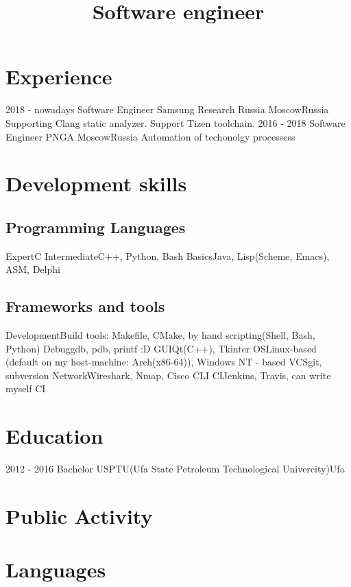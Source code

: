 \documentclass[11pt,a4paper]{moderncv}
\title{Software engineer}
\begin{document}
\makecvtitle

\section{\textbf{Experience}}
\cventry
    {2018 - nowadays}
    {Software Engineer}
    {Samsung Research Russia}
    {Moscow}{Russia}
    {Supporting Clang static analyzer. Support Tizen toolchain.}
\cventry
    {2016 - 2018}
    {Software Engineer}
    {PNGA}
    {Moscow}{Russia}
    {Automation of techonolgy processess}

\section{\textbf{Development skills}}
\subsection{\textbf{Programming Languages}}
\cvitem
    {Expert}{C}
\cvitem
    {Intermediate}{C++, Python, Bash}
\cvitem
    {Basics}{Java, Lisp(Scheme, Emacs), ASM, Delphi}
    
\subsection{\textbf{Frameworks and tools}}
\cvitem
    {Development}{Build tools: Makefile, CMake, by hand scripting(Shell, Bash, Python)}
\cvitem
    {Debug}{gdb, pdb, printf :D}
\cvitem
    {GUI}{Qt(C++), Tkinter}
\cvitem
    {OS}{Linux-based (default on my host-machine: Arch(x86-64)), Windows NT - based}
\cvitem
    {VCS}{git, subversion}
\cvitem
    {Network}{Wireshark, Nmap, Cisco CLI}
\cvitem
    {CI}{Jenkins, Travis, can write myself CI}
    
\section{\textbf{Education}}
\cventry
    {2012 - 2016}
    {Bachelor}
    {USPTU(Ufa State Petroleum Technological Univercity)}{Ufa}{}{}

\section{\textbf{Public Activity}}

\section{\textbf{Languages}}
\end{document}
